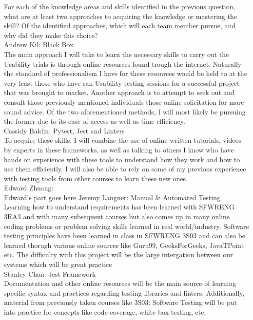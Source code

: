\documentclass[12pt, titlepage]{article}
\begin{document}
\begin{outline}[enumerate]
  \1 For each of the knowledge areas and skills identified in the previous
  question, what are at least two approaches to acquiring the knowledge or
  mastering the skill?  Of the identified approaches, which will each team
  member pursue, and why did they make this choice?\\
    \2 Andrew Kil: Black Box\\
    The main approach I will take to learn the necessary skills to carry out the Usability trials is through online resources found trough the internet. Naturally the standard of professionalism I have for these resources would be held to at the very least those who have ran Usability testing sessions for a successful project that was brought to market. Another approach is to attempt to seek out and consult those previously mentioned individuals those online solicitation for more sound advice. Of the two aforementioned methods, I will most likely be pursuing the former due to its ease of access as well as time efficiency.\\
    \2 Cassidy Baldin: Pytest, Jest and Linters\\
    To acquire these skills, I will combine the use of online written tutorials, videos by experts in these frameworks, as well as talking to others I know who have hands on experience with these tools to understand how they work and how to use them efficiently. I will also be able to rely on some of my previous experience with testing tools from other courses to learn these new ones.\\
    \2 Edward Zhuang: \\
	Edward's part goes here
    \2 Jeremy Langner: Manual \& Automated Testing\\
    Learning how to understand requirements has been learned with SFWRENG 3RA3 and with many subsequent courses but also comes up in many online coding problems or problem solving skills learned in real world/industry. Software testing principles have been learned in class in SFWRENG 3S03 and can also be learned thorugh various online sources like Guru99, GeeksForGeeks, JavaTPoint etc. The difficulty with this project will be the large intergation between our systems which will be great practice\\
    \2 Stanley Chan: Jest Framework\\
    Documentation and other online resources will be the main source of learning specific syntax and practices regarding testing libraries and linters. Additionally, material from previously taken courses like 3S03: Software Testing will be put into practice for concepts like code coverage, white box testing, etc.\\
\end{outline}
\end{document}
